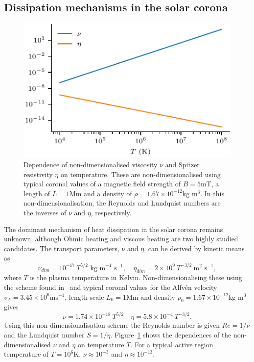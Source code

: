 \subsection{Dissipation mechanisms in the solar corona}

\begin{figure}[t]
  \centering
  \includegraphics[width=0.5\linewidth]{visc_dep_on_temp.pdf}
  \caption{Dependence of non-dimensionalised viscosity $\nu$ and Spitzer resistivity $\eta$ on temperature. These are non-dimensionalised using typical coronal values of a magnetic field strength of $B = 5$mT, a length of $L = 1$Mm and a density of $\rho = 1.67 \times 10^{-12}$kg m$^3$. In this non-dimensionalisation, the Reynolds and Lundquist numbers are the inverses of $\nu$ and $\eta$, respectively.}
  \label{fig:visc_dep_on_temp}
\end{figure}

The dominant mechanism of heat dissipation in the solar corona remains unknown, although Ohmic heating and viscous heating are two highly studied candidates. The transport parameters, $\nu$ and $\eta$, can be derived by kinetic means as
\begin{equation}
  \label{eq:nu_and_eta}
\nu_{dim} = 10^{-17}\ T^{5/2} \text{ kg m}^{-1}\text{ s}^{-1}, \quad \eta_{dim} = 2\times 10^{9}\ T^{-3/2}\ \text{m}^2 \text{ s}^{-1},
\end{equation}
where $T$ is the plasma temperature in Kelvin. Non-dimensionalising these using the scheme found in~\cite{arberStaggeredGridLagrangian2001} and typical coronal values for the Alfv\'en velocity $v_A = 3.45 \times 10^6$ms$^{-1}$, length scale $L_0 = 1$Mm and density $\rho_0 = 1.67 \times 10^{-12}$kg m$^3$ gives
\begin{equation}
  \label{eq:nondim_nu_and_eta}
\nu = 1.74 \times 10^{-18}\ T^{5/2} \quad \eta = 5.8 \times 10^{-4}\ T^{-3/2}.
\end{equation}
Using this non-dimensionalisation scheme the Reynolds number is given $Re = 1/\nu$ and the Lundquist number $S = 1/\eta$. Figure~\ref{fig:visc_dep_on_temp} shows the dependences of the non-dimensionalised $\nu$ and $\eta$ on temperature $T$. For a typical active region temperature of $T = 10^6$K, $\nu \approx 10^{-3}$ and $\eta \approx 10^{-13}$.

